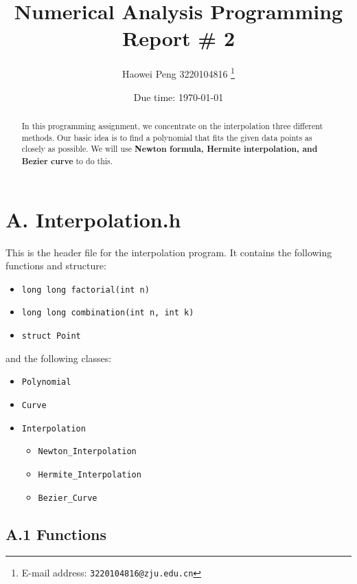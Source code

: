 \documentclass[a4paper]{article}
\begin{document}
\title{\textbf{Numerical Analysis Programming Report \# 2}}

\author{Haowei Peng 3220104816
  \thanks{E-mail address: \texttt{3220104816@zju.edu.cn}}}

\date{Due time: \today}

\maketitle

\begin{abstract}
    In this programming assignment, we concentrate on the interpolation three different methods. 
    Our basic idea is to find a polynomial that fits the given data points as closely as possible. 
    We will use \textbf{Newton formula, Hermite interpolation, and Bezier curve} to do this.
\end{abstract}

\section*{A. Interpolation.h}

This is the header file for the interpolation program. It contains the following functions and structure:
\begin{itemize}
    \item \verb|long long factorial(int n)|
    \item \verb|long long combination(int n, int k)|
    \item \verb|struct Point|
\end{itemize}

and the following classes:

\begin{itemize}
    \item \verb|Polynomial|
    \item \verb|Curve|
    \item \verb|Interpolation|
    \begin{itemize}
        \item \verb|Newton_Interpolation|
        \item \verb|Hermite_Interpolation|
        \item \verb|Bezier_Curve|
    \end{itemize}
\end{itemize}

\subsection*{A.1 Functions}
\end{document}
